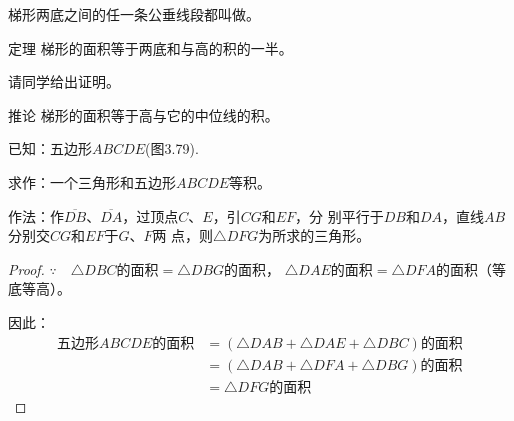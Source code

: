 梯形两底之间的任一条公垂线段都叫做。

\begin{Theorem}{定理}
梯形的面积等于两底和与高的积的一半。
\end{Theorem}

请同学给出证明。

\begin{Deduction}{推论}
梯形的面积等于高与它的中位线的积。
\end{Deduction}

\begin{figure}
    \begin{minipage}[t]{0.48\linewidth}
    \centering
\begin{tikzpicture}[>=latex, scale=1]
    \end{tikzpicture}
    \caption{}
    \end{minipage}
    \begin{minipage}[t]{0.48\linewidth}
    \centering
    \begin{tikzpicture}[>=latex, scale=1]
    \end{tikzpicture}
    \caption{}
    \end{minipage}
    \end{figure}

\begin{example}
    已知：五边形$ABCDE$(图3.79).

    求作：一个三角形和五边形$ABCDE$等积。
\end{example}

作法：作$\overline{DB}$、$\overline{DA}$，过顶点$C$、$E$，引$CG$和$EF$，分
别平行于$DB$和$DA$，直线$AB$分别交$CG$和$EF$于$G$、$F$两
点，则$\triangle DFG$为所求的三角形。

\begin{proof}
    $\because\quad \triangle DBC$的面积$=\triangle DBG$的面积，
    $\triangle DAE$的面积$=\triangle DFA$的面积（等底等高）。

因此：
\[\begin{split}
    \text{五边形$ABCDE$的面积}&=(\triangle DAB+\triangle DAE+\triangle DBC)\text{的面积}\\
&=(\triangle DAB+\triangle DFA+\triangle DBG)\text{的面积}\\
&=\triangle DFG\text{的面积}
\end{split}\]
\end{proof}


